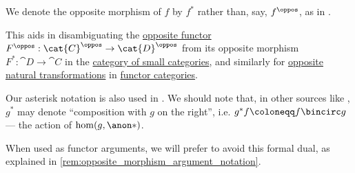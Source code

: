 \begin{remark}\label{rem:opposit_morphism_notation}
  We denote the opposite morphism of \( f \) by \( f^* \) rather than, say, \( f^\oppos \), as in \cite[33]{MacLane1998CategoryTheory}.

  This aids in disambiguating the \hyperref[def:opposite_functor]{opposite functor} \( F^\oppos: \cat{C}^\oppos \to \cat{D}^\oppos \) from its opposite morphism \( F^*: \cat{D} \to \cat{C} \) in the \hyperref[def:category_of_small_categories]{category of small categories}, and similarly for \hyperref[def:opposite_natural_transformation]{opposite natural transformations} in \hyperref[def:functor_category]{functor categories}.

  Our asterisk notation is also used in \cite[15]{Awodey2010CategoryTheory}. We should note that, in other sources like \cite[35]{MacLane1998CategoryTheory}, \( g^* \) may denote \enquote{composition with \( g \) on the right}, i.e. \( g^* f \coloneqq f \bincirc g \) --- the action of \( \hom(g, \anon*) \).

  When used as functor arguments, we will prefer to avoid this formal dual, as explained in \cref{rem:opposite_morphism_argument_notation}.
\end{remark}

